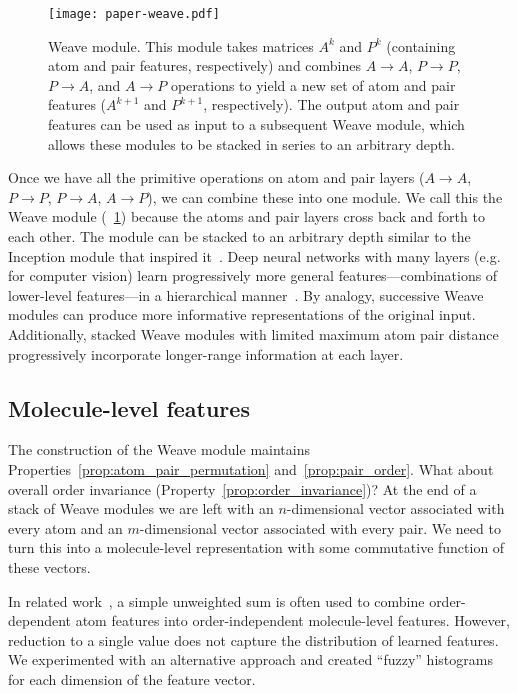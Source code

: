 \begin{figure}[tb]
\centering
  \texttt{[image: paper-weave.pdf]}
  \caption{Weave module. This module takes matrices $A^k$ and $P^k$ (containing
  atom and pair features, respectively) and combines $A\rightarrow A$,
  $P\rightarrow P$, $P\rightarrow A$, and $A\rightarrow P$ operations to yield a
  new set of atom and pair features ($A^{k+1}$ and $P^{k+1}$, respectively). The
  output atom and pair features can be used as input to a subsequent Weave
  module, which allows these modules to be stacked in series to an arbitrary
  depth.}
  \label{fig:weave}
\end{figure}
Once we have all the primitive operations on atom and pair layers
($A\rightarrow A$, $P\rightarrow P$, $P\rightarrow A$, $A\rightarrow P$), we
can combine these into one module.  We call this the Weave module
(\figurename~\ref{fig:weave}) because the atoms and pair layers cross back and forth
to each other. The module can be stacked to an arbitrary depth similar to the
Inception module that inspired it~\citep{szegedy2014going}.
Deep neural networks with many layers (e.g. for computer vision) learn
progressively more general features---combinations of lower-level features---in
a hierarchical manner~\citep{lecun2015deep}. By analogy, successive Weave
modules can produce more informative representations of the original input.
Additionally, stacked Weave modules with limited maximum atom pair distance
progressively incorporate longer-range information at each layer.

\subsection{Molecule-level features}
\label{sec:features}

The construction of the Weave module maintains
Properties~\ref{prop:atom_pair_permutation} and~\ref{prop:pair_order}. What
about overall order invariance (Property~\ref{prop:order_invariance})? At the
end of a stack of Weave modules we are left with an $n$-dimensional
vector associated with every atom and an $m$-dimensional vector associated with
every pair. We need to turn this into a molecule-level representation with some
commutative function of these vectors.

In related work~\citep{merkwirth2005automatic,
duvenaud2015convolutional, lusci2013deep}, a simple unweighted sum is
often used to combine order-dependent atom features into order-independent
molecule-level features. However, reduction to a single value does not capture
the distribution of learned features. We experimented with an alternative
approach and created ``fuzzy'' histograms for each dimension of the feature
vector.

